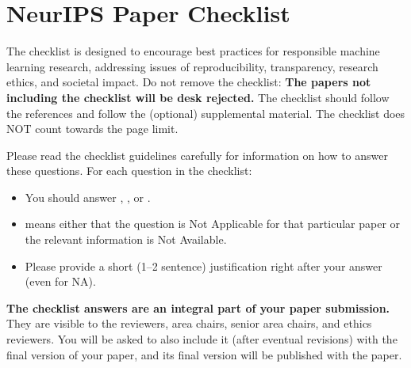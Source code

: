 \documentclass{article}
\begin{document}




\newpage
\section*{NeurIPS Paper Checklist}

The checklist is designed to encourage best practices for responsible machine learning research, addressing issues of reproducibility, transparency, research ethics, and societal impact. Do not remove the checklist: {\bf The papers not including the checklist will be desk rejected.} The checklist should follow the references and follow the (optional) supplemental material.  The checklist does NOT count towards the page
limit. 

Please read the checklist guidelines carefully for information on how to answer these questions. For each question in the checklist:
\begin{itemize}
    \item You should answer \answerYes{}, \answerNo{}, or \answerNA{}.
    \item \answerNA{} means either that the question is Not Applicable for that particular paper or the relevant information is Not Available.
    \item Please provide a short (1–2 sentence) justification right after your answer (even for NA). 
\end{itemize}

{\bf The checklist answers are an integral part of your paper submission.} They are visible to the reviewers, area chairs, senior area chairs, and ethics reviewers. You will be asked to also include it (after eventual revisions) with the final version of your paper, and its final version will be published with the paper.
\end{document}
